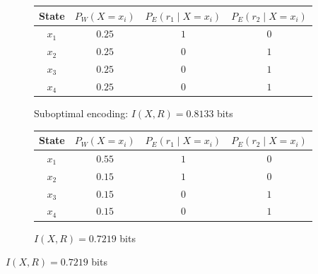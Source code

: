 \documentclass[nobib,nofonts]{tufte-handout}
\begin{document}
\begin{figure}[tp]
\begin{subfigure}[t]{0.48\linewidth}
\centering
\begin{tabular}{cccc}
\toprule
State & $P_{W}(X=x_{i})$ & $P_{E}(r_1\mid X=x_{i})$ & $P_{E}(r_2\mid X=x_{i})$ \\
\midrule
$x_1$ & $0.25$ & $1$ & $0$ \\
$x_2$ & $0.25$ & $0$ & $1$ \\
$x_3$ & $0.25$ & $0$ & $1$ \\
$x_4$ & $0.25$ & $0$ & $1$ \\
\bottomrule
\end{tabular}
\caption{Suboptimal encoding: $I(X,R) = 0.8133$ bits}
\end{subfigure}
\hfill
\begin{subfigure}[t]{0.48\linewidth}
\centering
\begin{tabular}{cccc}
\toprule
State & $P_{W}(X=x_{i})$ & $P_{E}(r_1\mid X=x_{i})$ & $P_{E}(r_2\mid X=x_{i})$ \\
\midrule
$x_1$ & $0.55$ & $1$ & $0$ \\
$x_2$ & $0.15$ & $1$ & $0$ \\
$x_3$ & $0.15$ & $0$ & $1$ \\
$x_4$ & $0.15$ & $0$ & $1$ \\
\bottomrule
\end{tabular}
\caption{$I(X,R) = 0.7219$ bits}
\end{subfigure}


\bigskip


\end{figure}
\end{document}
